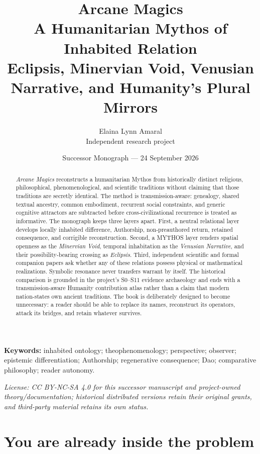 \documentclass[11pt]{article}
\title{\textbf{Arcane Magics}\\
\large A Humanitarian Mythos of Inhabited Relation\\
\normalsize Eclipsis, Minervian Void, Venusian Narrative, and Humanity's Plural Mirrors}
\author{Elaina Lynn Amaral\\\small Independent research project}
\date{Successor Monograph --- 24 September 2026}
\begin{document}
\maketitle

\begin{abstract}
\emph{Arcane Magics} reconstructs a humanitarian Mythos from historically distinct
religious, philosophical, phenomenological, and scientific traditions without
claiming that those traditions are secretly identical.  The method is
transmission-aware: genealogy, shared textual ancestry, common embodiment,
recurrent social constraints, and generic cognitive attractors are subtracted
before cross-civilizational recurrence is treated as informative.  The monograph
keeps three layers apart.  First, a neutral relational layer develops locally
inhabited difference, Authorship, non-preauthored return, retained consequence,
and corrigible reconstruction.  Second, a MYTHOS layer renders spatial openness
as the \emph{Minervian Void}, temporal inhabitation as the \emph{Venusian
Narrative}, and their possibility-bearing crossing as \emph{Eclipsis}.  Third,
independent scientific and formal companion papers ask whether any of these
relations possess physical or mathematical realizations.  Symbolic resonance
never transfers warrant by itself.  The historical comparison is grounded in the
project's S0--S11 evidence archaeology and ends with a transmission-aware
Humanity contribution atlas rather than a claim that modern nation-states own
ancient traditions.  The book is deliberately designed to become unnecessary:
a reader should be able to replace its names, reconstruct its operators, attack
its bridges, and retain whatever survives.
\end{abstract}

\noindent\textbf{Keywords:} inhabited ontology; theophenomenology; perspective; observer; epistemic differentiation; Authorship; regenerative consequence; Dao; comparative philosophy; reader autonomy.

\medskip
\noindent\small\textit{License: CC BY-NC-SA 4.0 for this successor manuscript and project-owned theory/documentation; historical distributed versions retain their original grants, and third-party material retains its own status.}\normalsize

\tableofcontents
\newpage

\section{You are already inside the problem}
\end{document}

